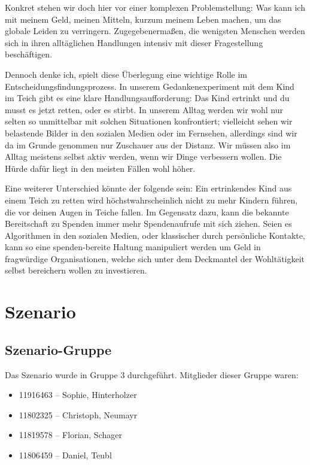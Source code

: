 \documentclass[twoside, a4paper, DIV=11, open=any, bibliography=totoc]{scrbook}
\begin{document}
Konkret stehen wir doch hier vor einer komplexen Problemstellung:
Was kann ich mit meinem Geld, meinen Mitteln, kurzum meinem Leben machen,
um das globale Leiden zu verringern.
Zugegebenermaßen, die wenigsten Menschen werden sich in ihren alltäglichen Handlungen
intensiv mit dieser Fragestellung beschäftigen.

Dennoch denke ich, spielt diese Überlegung eine wichtige Rolle im Entscheidungsfindungsprozess.
In unserem Gedankenexperiment mit dem Kind im Teich gibt es eine klare Handlungsaufforderung:
Das Kind ertrinkt und du musst es jetzt retten, oder es stirbt.
In unserem Alltag werden wir wohl nur selten so unmittelbar mit solchen Situationen konfrontiert;
vielleicht sehen wir belastende Bilder in den sozialen Medien oder im Fernsehen,
allerdings sind wir da im Grunde genommen nur Zuschauer aus der Distanz.
Wir müssen also im Alltag meistens selbst aktiv werden, wenn wir Dinge verbessern
wollen. Die Hürde dafür liegt in den meisten Fällen wohl höher.

Eine weiterer Unterschied könnte der folgende sein: Ein ertrinkendes Kind aus
einem Teich zu retten wird höchstwahrscheinlich nicht zu mehr Kindern führen,
die vor deinen Augen in Teiche fallen. Im Gegensatz dazu, kann die bekannte
Bereitschaft zu Spenden immer mehr Spendenaufrufe mit sich ziehen.
Seien es Algorithmen in den sozialen Medien, oder klassischer durch persönliche
Kontakte, kann so eine spenden-bereite Haltung manipuliert werden um Geld in
fragwürdige Organisationen, welche sich unter dem Deckmantel der Wohltätigkeit
selbst bereichern wollen zu investieren.

\chapter{Szenario} \label{chap:szenario}

\section{Szenario-Gruppe} \label{sec:szengruppe}

Das Szenario wurde in Gruppe 3 durchgeführt. Mitglieder dieser Gruppe waren:

\begin{itemize}
    \item 11916463 – Sophie, Hinterholzer
    \item 11802325 – Christoph, Neumayr
    \item 11819578 – Florian, Schager
    \item 11806459 – Daniel, Teubl
\end{itemize}
\end{document}
